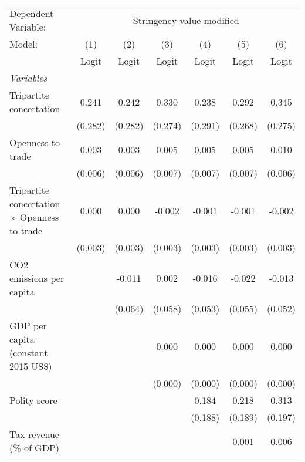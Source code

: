 
\begingroup
\centering
\begin{tabular}{lcccccc}
   \toprule
   Dependent Variable: & \multicolumn{6}{c}{Stringency value modified}\\
   Model:                                              & (1)     & (2)     & (3)     & (4)     & (5)     & (6)\\  
                                                       &  Logit  & Logit   & Logit   & Logit   & Logit   & Logit\\  
   \midrule
   \emph{Variables}\\
   Tripartite concertation                             & 0.241   & 0.242   & 0.330   & 0.238   & 0.292   & 0.345\\   
                                                       & (0.282) & (0.282) & (0.274) & (0.291) & (0.268) & (0.275)\\   
   Openness to trade                                   & 0.003   & 0.003   & 0.005   & 0.005   & 0.005   & 0.010\\   
                                                       & (0.006) & (0.006) & (0.007) & (0.007) & (0.007) & (0.006)\\   
   Tripartite concertation $\times$ Openness to trade  & 0.000   & 0.000   & -0.002  & -0.001  & -0.001  & -0.002\\   
                                                       & (0.003) & (0.003) & (0.003) & (0.003) & (0.003) & (0.003)\\   
   CO2 emissions per capita                            &         & -0.011  & 0.002   & -0.016  & -0.022  & -0.013\\   
                                                       &         & (0.064) & (0.058) & (0.053) & (0.055) & (0.052)\\   
   GDP per capita (constant 2015 US\$)                 &         &         & 0.000   & 0.000   & 0.000   & 0.000\\   
                                                       &         &         & (0.000) & (0.000) & (0.000) & (0.000)\\   
   Polity score                                        &         &         &         & 0.184   & 0.218   & 0.313\\   
                                                       &         &         &         & (0.188) & (0.189) & (0.197)\\   
   Tax revenue (\% of GDP)                             &         &         &         &         & 0.001   & 0.006\\   

\end{tabular}
